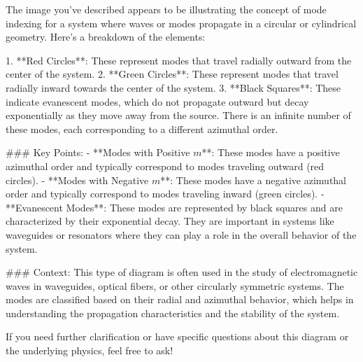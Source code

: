 The image you've described appears to be illustrating the concept of mode indexing for a system where waves or modes propagate in a circular or cylindrical geometry. Here's a breakdown of the elements:

1. **Red Circles**: These represent modes that travel radially outward from the center of the system.
2. **Green Circles**: These represent modes that travel radially inward towards the center of the system.
3. **Black Squares**: These indicate evanescent modes, which do not propagate outward but decay exponentially as they move away from the source. There is an infinite number of these modes, each corresponding to a different azimuthal order.

### Key Points:
- **Modes with Positive \( m \)**: These modes have a positive azimuthal order and typically correspond to modes traveling outward (red circles).
- **Modes with Negative \( m \)**: These modes have a negative azimuthal order and typically correspond to modes traveling inward (green circles).
- **Evanescent Modes**: These modes are represented by black squares and are characterized by their exponential decay. They are important in systems like waveguides or resonators where they can play a role in the overall behavior of the system.

### Context:
This type of diagram is often used in the study of electromagnetic waves in waveguides, optical fibers, or other circularly symmetric systems. The modes are classified based on their radial and azimuthal behavior, which helps in understanding the propagation characteristics and the stability of the system.

If you need further clarification or have specific questions about this diagram or the underlying physics, feel free to ask!